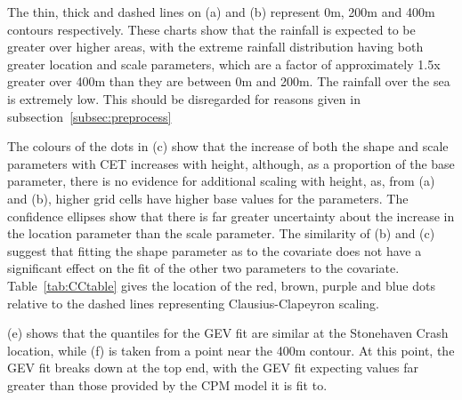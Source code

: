 The thin, thick and dashed lines on (a) and (b) represent 0m, 200m and 400m contours respectively.
These charts show that the rainfall is expected to be greater over higher areas,
    with the extreme rainfall distribution having both greater location and scale parameters,
    which are a factor of approximately 1.5x greater over 400m than they are between 0m and 200m.
The rainfall over the sea is extremely low.
This should be disregarded for reasons given in subsection~\ref{subsec:preprocess}

The colours of the dots in (c) show that the increase of both the shape and scale parameters with CET
    increases with height,
    although, as a proportion of the base parameter, there is no evidence for additional scaling with height,
    as, from (a) and (b), higher grid cells have higher base values for the parameters.
The confidence ellipses show that there is far greater uncertainty about the increase in the location parameter
    than the scale parameter.
The similarity of (b) and (c) suggest that fitting the shape parameter as to the covariate does not have
    a significant effect on the fit of the other two parameters to the covariate.
Table~\ref{tab:CCtable} gives the location of the red, brown, purple and blue dots relative to the
    dashed lines representing Clausius-Clapeyron scaling.

(e) shows that the quantiles for the GEV fit are similar at the Stonehaven Crash location,
    while (f) is taken from a point near the 400m contour.
At this point, the GEV fit breaks down at the top end,
    with the GEV fit expecting values far greater than those provided by the CPM model it is fit to.

